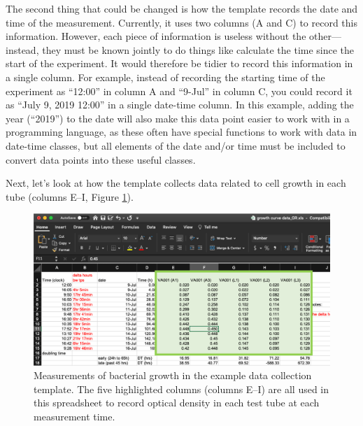 \documentclass[]{tufte-book}
\begin{document}
The second thing that could be changed is how the template records the date and time
of the measurement. Currently, it uses two columns (A and C) to record this information.
However, each piece of information is useless without the other---instead, they must
be known jointly to do things like calculate the time since the start of the
experiment. It would therefore be tidier to record this information in a single column.
For example, instead of recording the starting time of the experiment as ``12:00'' in
column A and ``9-Jul'' in column C, you could record it as ``July 9, 2019 12:00'' in a
single date-time column. In this example, adding the year (``2019'') to the date will
also make this data point easier to work with in a programming language, as these often
have special functions to work with data in date-time classes, but all elements of the
date and/or time must be included to convert data points into these useful classes.

Next, let's look at how the template collects data related to cell growth in each tube
(columns E--I, Figure \ref{fig:growthmeasures}).

\begin{figure}
\includegraphics[width=\textwidth]{figures/growth_curve_growth_measures} \caption[Measurements of bacterial growth in the example data collection template]{Measurements of bacterial growth in the example data collection template. The five highlighted columns (columns E--I) are all used in this spreadsheet to record optical density in each test tube at each measurement time.}\label{fig:growthmeasures}
\end{figure}
\end{document}
